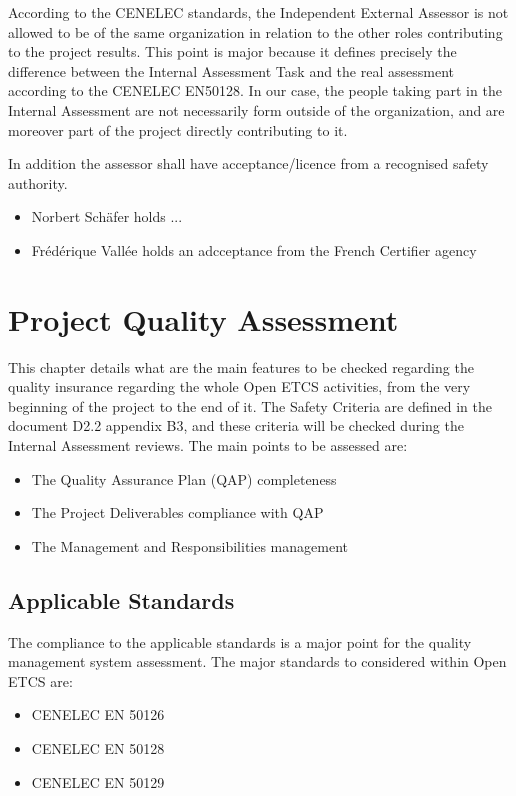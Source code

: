 \documentclass{template/openetcs_article}
\begin{document}
According to the CENELEC standards, the Independent External Assessor is not allowed to be of the same organization in relation to the other roles contributing to the project results.
This point is major because it defines precisely the difference between the Internal Assessment Task and the real assessment according to the CENELEC EN50128. In our case, the people taking part in the Internal Assessment are not necessarily form outside of the organization, and are moreover part of the project directly contributing to it. 

In addition the assessor shall have acceptance/licence from a recognised safety authority.
\begin{itemize}
\item Norbert Sch\"afer holds ...
\item Fr\'ed\'erique Vall\'ee holds an adcceptance from the French Certifier agency
\end{itemize}







\newpage
\section{Project Quality Assessment}
This chapter details what are the main features to be checked regarding the quality insurance regarding the whole Open ETCS activities, from the very beginning of the project to the end of it.
The Safety Criteria are defined in the document D2.2 appendix B3, and these criteria will be checked during the Internal Assessment reviews. The main points to be assessed are:
\begin{itemize}
\item The Quality Assurance Plan (QAP) completeness
\item The Project Deliverables compliance with QAP
\item The Management and Responsibilities management 
\end{itemize}

\subsection{Applicable Standards}
The compliance to the applicable standards is a major point for the quality management system assessment.
The major standards to considered within Open ETCS are:
\begin{itemize}
\item CENELEC EN 50126 \cite{EN50126}
\item CENELEC EN 50128 \cite{EN50128}
\item CENELEC EN 50129 \cite{EN50129}
\end{itemize}
\end{document}

